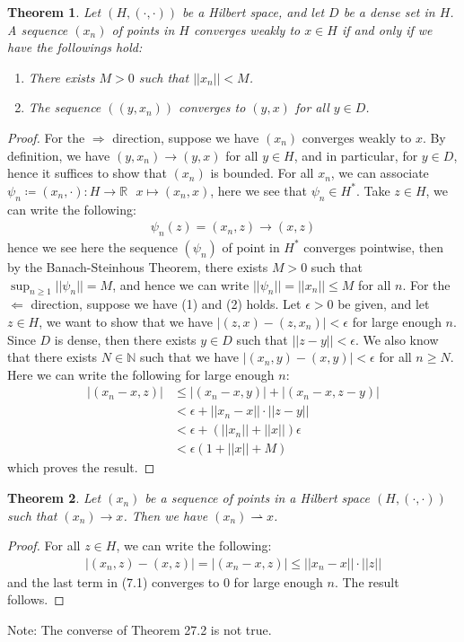 \documentclass[11pt]{book}
\theoremstyle{break}
\theoremstyle{break}
\newtheorem{thm}{Theorem}[section]
\newcommand{\R}{\mathbb{R}}
\newcommand{\N}{\mathbb{N}}
\newcommand{\note}{\color{red}Note: \color{black}}
\begin{document}
\begin{thm}
Let $(H,(\cdot,\cdot))$ be a Hilbert space, and let $D$ be a dense set in $H$. A sequence $(x_n)$ of points in $H$ converges weakly to $x \in H$ if and only if we have the followings hold: 
\begin{enumerate}[topsep=3pt,itemsep=-1ex,partopsep=1ex,parsep=1ex]
\item There exists $M>0$ such that $||x_n||<M$.
\item The sequence $((y,x_n))$ converges to $(y,x)$ for all $y \in D$. 
\end{enumerate}
\end{thm}
\begin{proof}
For the $\Rightarrow$ direction, suppose we have $(x_n)$ converges weakly to $x$. By definition, we have $(y,x_n) \to (y,x)$ for all $y \in H$, and in particular, for $y \in D$, hence it suffices to show that $(x_n)$ is bounded. For all $x_n$, we can associate $\psi_n \coloneqq (x_n, \cdot):H \to \R \ \ \ x\mapsto (x_n, x)$, here we see that $\psi_n\in H^*$. Take $z\in H$, we can write the following:
\begin{align*}
\psi_n(z) = (x_n, z) \to (x,z)
\end{align*}
hence we see here the sequence $(\psi_n)$ of point in $H^*$ converges pointwise, then by the Banach-Steinhous Theorem, there exists $M >0$ such that $\sup_{n \geq 1}||\psi_n||=M$, and hence we can write $||\psi_n|| = ||x_n|| \leq M$ for all $n$. For the $\Leftarrow$ direction, suppose we have (1) and (2) holds. Let $\epsilon>0$ be given, and let $z \in H$, we want to show that we have $|(z,x) - (z,x_n)|<\epsilon$ for large enough $n$. Since $D$ is dense, then there exists $y \in D$ such that $||z-y|| < \epsilon$. We also know that there exists $N \in \N$ such that we have $
|(x_n,y) - (x,y)|<\epsilon $ for all $n \geq N$. Here we can write the following for large enough $n$:
\begin{align*}
|(x_n - x,z)| &\leq |(x_n-x,y)| + |(x_n-x, z-y)|\\
&< \epsilon + ||x_n -x|| \cdot ||z-y||\\
&< \epsilon + (||x_n|| + ||x||) \epsilon\\
&< \epsilon \left( 1+ ||x|| + M\right)
\end{align*}
which proves the result. 
\end{proof}


\begin{thm}
Let $(x_n)$ be a sequence of points in a Hilbert space $(H,(\cdot,\cdot))$ such that $(x_n) \to x$. Then we have $(x_n) \rightharpoonup x$. 
\end{thm}
\begin{proof}
For all $z \in H$, we can write the following:
\begin{align}
|(x_n,z) - (x,z)| = |(x_n-x,z)| \leq ||x_n-x|| \cdot ||z|| 
\end{align}
and the last term in (7.1) converges to $0$ for large enough $n$. The result follows.
\end{proof}
\note The converse of Theorem 27.2 is not true. 
\end{document}
